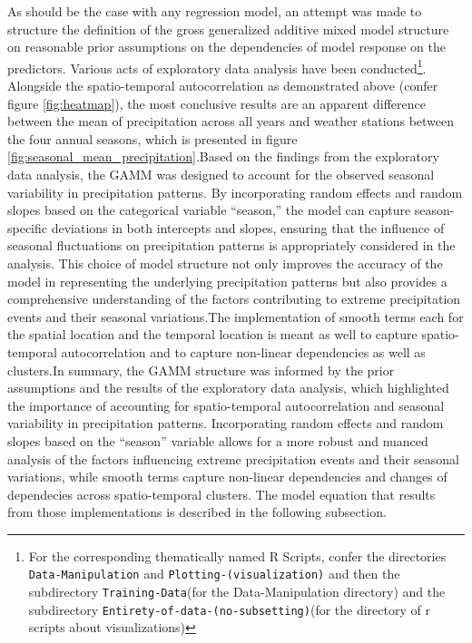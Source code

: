 \documentclass[
  12pt,
]{article}
\begin{document}
As should be the case with any regression model, an attempt was made to
structure the definition of the gross generalized additive mixed model
structure on reasonable prior assumptions on the dependencies of model
response on the predictors. Various acts of exploratory data analysis
have been
conducted\footnote{For the corresponding thematically named R Scripts, confer the directories \texttt{Data-Manipulation} and \texttt{Plotting-(visualization)} and then the subdirectory \texttt{Training-Data}(for the Data-Manipulation directory) and the subdirectory \texttt{Entirety-of-data-(no-subsetting)}(for the directory of r scripts about visualizations)}.
Alongside the spatio-temporal autocorrelation as demonstrated above
(confer figure \ref{fig:heatmap}), the most conclusive results are an
apparent difference between the mean of precipitation across all years
and weather stations between the four annual seasons, which is presented
in figure \ref{fig:seasonal_mean_precipitation}.\newline Based on the
findings from the exploratory data analysis, the GAMM was designed to
account for the observed seasonal variability in precipitation patterns.
By incorporating random effects and random slopes based on the
categorical variable ``season,'' the model can capture season-specific
deviations in both intercepts and slopes, ensuring that the influence of
seasonal fluctuations on precipitation patterns is appropriately
considered in the analysis. This choice of model structure not only
improves the accuracy of the model in representing the underlying
precipitation patterns but also provides a comprehensive understanding
of the factors contributing to extreme precipitation events and their
seasonal variations.\newline The implementation of smooth terms each for
the spatial location and the temporal location is meant as well to
capture spatio-temporal autocorrelation and to capture non-linear
dependencies as well as clusters.\newline In summary, the GAMM structure
was informed by the prior assumptions and the results of the exploratory
data analysis, which highlighted the importance of accounting for
spatio-temporal autocorrelation and seasonal variability in
precipitation patterns. Incorporating random effects and random slopes
based on the ``season'' variable allows for a more robust and nuanced
analysis of the factors influencing extreme precipitation events and
their seasonal variations, while smooth terms capture non-linear
dependencies and changes of dependecies across spatio-temporal clusters.
The model equation that results from those implementations is described
in the following subsection.
\end{document}
